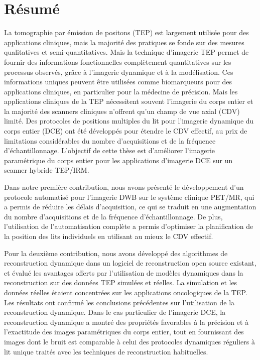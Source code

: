 \section*{Résumé}
La tomographie par émission de positons (TEP) est largement utilisée pour des applications cliniques, mais la majorité des pratiques se fonde sur des mesures qualitatives et semi-quantitatives. Mais la technique d'imagerie TEP permet de fournir des informations fonctionnelles complètement quantitatives sur les processus observés, grâce à l'imagerie dynamique et à la modélisation. Ces informations uniques peuvent être utilisées comme biomarqueurs pour des applications cliniques, en particulier pour la médecine de précision. Mais les applications cliniques de la TEP nécessitent souvent l'imagerie du corps entier et la majorité des scanners cliniques n'offrent qu'un champ de vue axial (CDV) limité. Des protocoles de positions multiples du lit pour l'imagerie dynamique du corps entier (DCE) ont été développés pour étendre le CDV effectif, au prix de limitations considérables du nombre d'acquisitions et de la fréquence d'échantillonnage. L'objectif de cette thèse est d'améliorer l'imagerie paramétrique du corps entier pour les applications d'imagerie DCE sur un scanner hybride TEP/IRM.

Dans notre première contribution, nous avons présenté le développement d'un protocole automatisé pour l'imagerie DWB sur le système clinique PET/MR, qui a permis de réduire les délais d'acquisition, ce qui se traduit en une augmentation du nombre d'acquisitions et de la fréquence d'échantillonnage. De plus, l'utilisation de l'automatisation complète a permis d'optimiser la planification de la position des lits individuels en utilisant au mieux le CDV effectif. 

Pour la deuxième contribution, nous avons développé des algorithmes de reconstruction dynamique dans un logiciel de reconstruction open source existant, et évalué les avantages offerts par l'utilisation de modèles dynamiques dans la reconstruction sur des données TEP simulées et réelles. 
La simulation et les données réelles étaient concentrées sur les applications oncologiques de la TEP. Les résultats ont confirmé les conclusions précédentes sur l'utilisation de la reconstruction dynamique. Dans le cas particulier de l'imagerie DCE, la reconstruction dynamique a montré des propriétés favorables à la précision et à l'exactitude des images paramétriques du corps entier, tout en fournissant des images dont le bruit est comparable à celui des protocoles dynamiques réguliers à lit unique traités avec les techniques de reconstruction habituelles.

